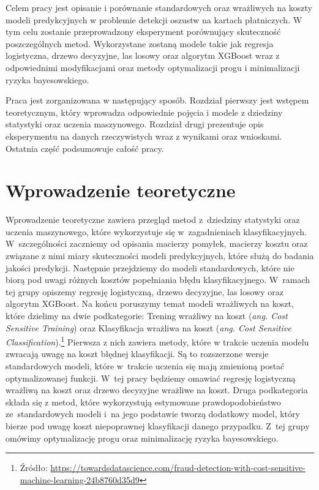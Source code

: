 \documentclass[inzynierska]{pwr_wmat_praca_dyplomowa}
\theoremstyle{plain}
\numberwithin{theorem}{chapter}
\theoremstyle{definition}
\numberwithin{theorem}{chapter}
\begin{document}
Celem pracy jest opisanie i porównanie standardowych oraz wrażliwych na koszty modeli predykcyjnych w problemie detekcji oszustw na kartach płatniczych. W tym celu zostanie przeprowadzony eksperyment porównujący skuteczność poszczególnych metod. Wykorzystane zostaną modele takie jak regresja logistyczna, drzewo decyzyjne, las losowy oraz algorytm XGBoost wraz z odpowiednimi modyfikacjami oraz metody optymalizacji progu i minimalizacji ryzyka bayesowskiego.

Praca jest zorganizowana w następujący sposób. Rozdział pierwszy jest wstępem teoretycznym, który wprowadza odpowiednie pojęcia i modele z dziedziny statystyki oraz uczenia maszynowego. Rozdział drugi prezentuje opis eksperymentu na danych rzeczywistych wraz z wynikami oraz wnioskami. Ostatnia część podsumowuje całość pracy.

\chapter{Wprowadzenie teoretyczne}

Wprowadzenie teoretyczne zawiera przegląd metod z~dziedziny statystyki oraz uczenia maszynowego, które wykorzystuje się w~zagadnieniach klasyfikacyjnych. W~szczególności zaczniemy od opisania macierzy pomyłek, macierzy kosztu oraz związane z nimi miary skuteczności modeli predykcyjnych, które służą do badania jakości predykcji. Następnie przejdziemy do modeli standardowych, które nie biorą pod uwagi różnych kosztów popełniania błędu klasyfikacyjnego. W~ramach tej grupy opiszemy regresję logistyczną, drzewo decyzyjne, las losowy oraz algorytm XGBoost. Na końcu poruszymy temat modeli wrażliwych na koszt, które dzielimy na dwie podkategorie: Trening wrażliwy na koszt (\textit{ang. Cost Sensitive Training}) oraz Klasyfikacja wrażliwa na koszt (\textit{ang. Cost Sensitive Classification}).\footnote{Źródło:  \url{https://towardsdatascience.com/fraud-detection-with-cost-sensitive-machine-learning-24b8760d35d9}} Pierwsza z nich zawiera metody, które w trakcie uczenia modelu zwracają uwagę na koszt błędnej klasyfikacji. Są to rozszerzone wersje standardowych modeli, które w~trakcie uczenia się mają zmienioną postać optymalizowanej funkcji. W~tej pracy będziemy omawiać regresję logistyczną wrażliwą na koszt oraz drzewo decyzyjne wrażliwe na koszt. Druga podkategoria składa się z metod, które wykorzystują estymowane prawdopodobieństwo ze~standardowych modeli i~na jego podstawie tworzą dodatkowy model, który bierze pod uwagę koszt niepoprawnej klasyfikacji danego przypadku. Z~tej grupy omówimy optymalizację progu oraz minimalizację ryzyka bayesowskiego.
\end{document}
